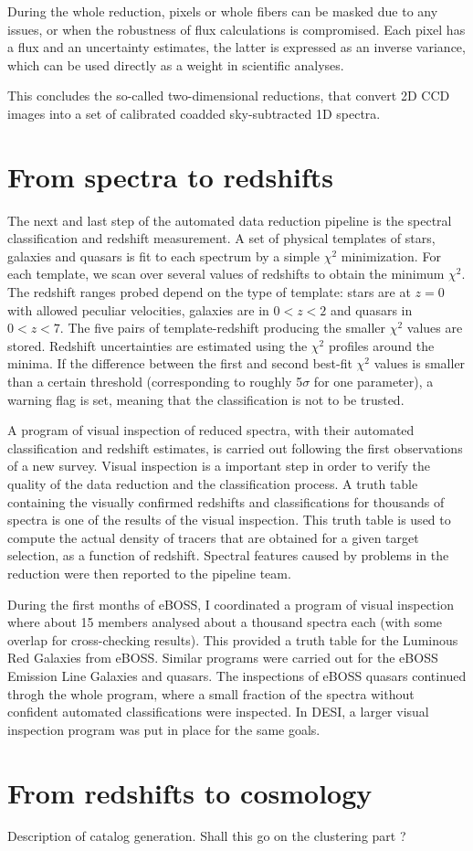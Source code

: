During the whole reduction, pixels or whole fibers can be masked due to any issues, 
or when the robustness of flux calculations is compromised. 
Each pixel has a flux and an uncertainty estimates, the latter is expressed 
as an inverse variance, which can be used directly as a weight in scientific analyses.

This concludes the so-called two-dimensional reductions, 
that convert 2D CCD images into a set of calibrated coadded sky-subtracted 1D spectra. 


\section{From spectra to redshifts}
\label{spectro:pipeline1d}

The next and last step of the automated data reduction pipeline is the 
spectral classification and redshift measurement. 
A set of physical templates of stars, galaxies and quasars is fit to 
each spectrum by a simple $\chi^2$ minimization. For each template, 
we scan over several values of redshifts to obtain the minimum $\chi^2$. 
The redshift ranges probed depend on the type of template: 
stars are at $z =0$ with allowed peculiar velocities, galaxies are 
in $0 < z < 2$ and quasars in $0 < z <7 $. The five pairs of 
template-redshift producing the smaller $\chi^2$ values are stored. 
Redshift uncertainties are estimated using the $\chi^2$ profiles around the minima.
If the difference between the first and second best-fit $\chi^2$ values
is smaller than a certain threshold (corresponding to roughly 
5$\sigma$ for one parameter), a warning flag is set, meaning 
that the classification is not to be trusted. 

A program of visual inspection of reduced spectra, with their automated classification
and redshift estimates, is carried out following the first observations 
of a new survey. Visual inspection is a important step in order to verify 
the quality of the data reduction and the classification process. 
A truth table containing the visually confirmed redshifts and classifications
for thousands of spectra is one of the results of the visual inspection. 
This truth table is used to compute the actual density of tracers that are 
obtained for a given target selection, as a function of redshift. 
Spectral features caused by problems in the reduction were then reported to the
pipeline team. 

During the first months of eBOSS, I coordinated a program of 
visual inspection where about 15 members analysed about a thousand spectra each
(with some overlap for cross-checking results). This provided a truth table
for the Luminous Red Galaxies from eBOSS. Similar programs were carried out
for the eBOSS Emission Line Galaxies and quasars. The inspections of eBOSS quasars
continued throgh the whole program, where a small fraction of
the spectra without confident automated classifications were inspected.
In DESI, a larger visual inspection program was put in place for the same goals.



\section{From redshifts to cosmology}
\label{spectro:catalogs}

Description of catalog generation. Shall this go on 
the clustering part ? 

